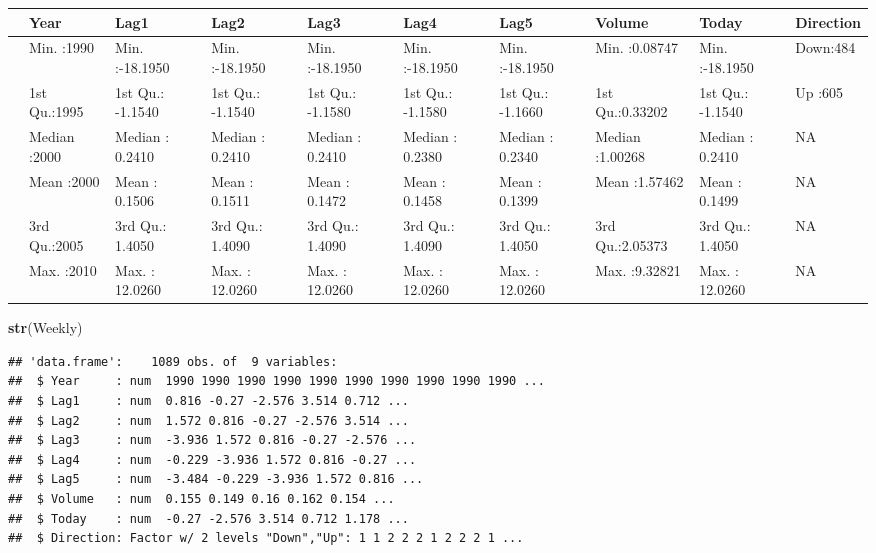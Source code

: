 \documentclass[]{article}
\newenvironment{Shaded}{\begin{snugshade}}{\end{snugshade}}
\newcommand{\KeywordTok}[1]{\textcolor[rgb]{0.13,0.29,0.53}{\textbf{#1}}}
\newcommand{\NormalTok}[1]{#1}
\begin{document}
\begin{tabular}{l|l|l|l|l|l|l|l|l|l}
\hline
  &      Year &      Lag1 &      Lag2 &      Lag3 &      Lag4 &      Lag5 &     Volume &     Today & Direction\\
\hline
 & Min.   :1990 & Min.   :-18.1950 & Min.   :-18.1950 & Min.   :-18.1950 & Min.   :-18.1950 & Min.   :-18.1950 & Min.   :0.08747 & Min.   :-18.1950 & Down:484\\
\hline
 & 1st Qu.:1995 & 1st Qu.: -1.1540 & 1st Qu.: -1.1540 & 1st Qu.: -1.1580 & 1st Qu.: -1.1580 & 1st Qu.: -1.1660 & 1st Qu.:0.33202 & 1st Qu.: -1.1540 & Up  :605\\
\hline
 & Median :2000 & Median :  0.2410 & Median :  0.2410 & Median :  0.2410 & Median :  0.2380 & Median :  0.2340 & Median :1.00268 & Median :  0.2410 & NA\\
\hline
 & Mean   :2000 & Mean   :  0.1506 & Mean   :  0.1511 & Mean   :  0.1472 & Mean   :  0.1458 & Mean   :  0.1399 & Mean   :1.57462 & Mean   :  0.1499 & NA\\
\hline
 & 3rd Qu.:2005 & 3rd Qu.:  1.4050 & 3rd Qu.:  1.4090 & 3rd Qu.:  1.4090 & 3rd Qu.:  1.4090 & 3rd Qu.:  1.4050 & 3rd Qu.:2.05373 & 3rd Qu.:  1.4050 & NA\\
\hline
 & Max.   :2010 & Max.   : 12.0260 & Max.   : 12.0260 & Max.   : 12.0260 & Max.   : 12.0260 & Max.   : 12.0260 & Max.   :9.32821 & Max.   : 12.0260 & NA\\
\hline
\end{tabular}

\begin{Shaded}
\begin{Highlighting}[]
\KeywordTok{str}\NormalTok{(Weekly)}
\end{Highlighting}
\end{Shaded}

\begin{verbatim}
## 'data.frame':    1089 obs. of  9 variables:
##  $ Year     : num  1990 1990 1990 1990 1990 1990 1990 1990 1990 1990 ...
##  $ Lag1     : num  0.816 -0.27 -2.576 3.514 0.712 ...
##  $ Lag2     : num  1.572 0.816 -0.27 -2.576 3.514 ...
##  $ Lag3     : num  -3.936 1.572 0.816 -0.27 -2.576 ...
##  $ Lag4     : num  -0.229 -3.936 1.572 0.816 -0.27 ...
##  $ Lag5     : num  -3.484 -0.229 -3.936 1.572 0.816 ...
##  $ Volume   : num  0.155 0.149 0.16 0.162 0.154 ...
##  $ Today    : num  -0.27 -2.576 3.514 0.712 1.178 ...
##  $ Direction: Factor w/ 2 levels "Down","Up": 1 1 2 2 2 1 2 2 2 1 ...
\end{verbatim}
\end{document}
